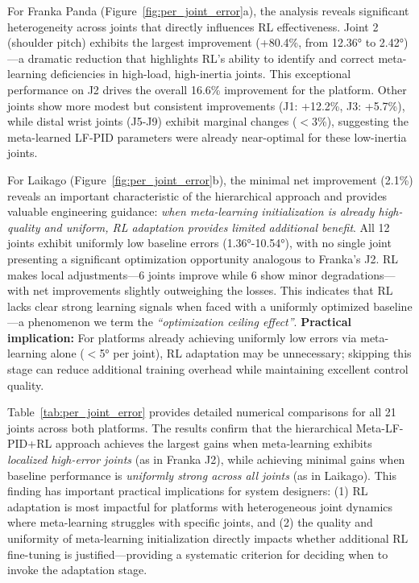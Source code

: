 \documentclass[a4paper]{cas-sc}
\begin{document}
For Franka Panda (Figure~\ref{fig:per_joint_error}a), the analysis reveals significant heterogeneity across joints that directly influences RL effectiveness. Joint 2 (shoulder pitch) exhibits the largest improvement (+80.4\%, from 12.36° to 2.42°)—a dramatic reduction that highlights RL's ability to identify and correct meta-learning deficiencies in high-load, high-inertia joints. This exceptional performance on J2 drives the overall 16.6\% improvement for the platform. Other joints show more modest but consistent improvements (J1: +12.2\%, J3: +5.7\%), while distal wrist joints (J5-J9) exhibit marginal changes ($<$3\%), suggesting the meta-learned LF-PID parameters were already near-optimal for these low-inertia joints.

For Laikago (Figure~\ref{fig:per_joint_error}b), the minimal net improvement (2.1\%) reveals an important characteristic of the hierarchical approach and provides valuable engineering guidance: \textit{when meta-learning initialization is already high-quality and uniform, RL adaptation provides limited additional benefit}. All 12 joints exhibit uniformly low baseline errors (1.36°-10.54°), with no single joint presenting a significant optimization opportunity analogous to Franka's J2. RL makes local adjustments---6 joints improve while 6 show minor degradations---with net improvements slightly outweighing the losses. This indicates that RL lacks clear strong learning signals when faced with a uniformly optimized baseline---a phenomenon we term the \textit{``optimization ceiling effect''}. \textbf{Practical implication:} For platforms already achieving uniformly low errors via meta-learning alone ($<$5° per joint), RL adaptation may be unnecessary; skipping this stage can reduce additional training overhead while maintaining excellent control quality.

Table~\ref{tab:per_joint_error} provides detailed numerical comparisons for all 21 joints across both platforms. The results confirm that the hierarchical Meta-LF-PID+RL approach achieves the largest gains when meta-learning exhibits \textit{localized high-error joints} (as in Franka J2), while achieving minimal gains when baseline performance is \textit{uniformly strong across all joints} (as in Laikago). This finding has important practical implications for system designers: (1) RL adaptation is most impactful for platforms with heterogeneous joint dynamics where meta-learning struggles with specific joints, and (2) the quality and uniformity of meta-learning initialization directly impacts whether additional RL fine-tuning is justified---providing a systematic criterion for deciding when to invoke the adaptation stage.
\end{document}
